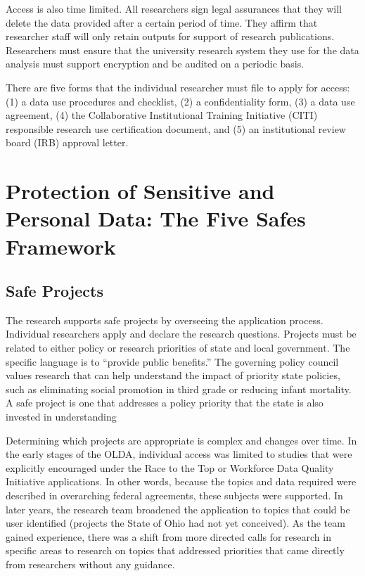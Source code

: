 Access is also time limited. All researchers sign legal assurances that they will delete the data provided after a certain period of time. They affirm that researcher staff will only retain outputs for support of research publications. Researchers must ensure that the university research system they use for the data analysis must support encryption and be audited on a periodic basis.

There are five forms that the individual researcher must file to apply for access: (1) a data use procedures and checklist, (2) a confidentiality form, (3) a data use agreement, (4) the Collaborative Institutional Training Initiative (CITI) responsible research use certification document, and (5) an institutional review board (IRB) approval letter.

\hypertarget{protection-of-sensitive-and-personal-data-the-five-safes-framework-1}{%
\section{Protection of Sensitive and Personal Data: The Five Safes Framework}\label{protection-of-sensitive-and-personal-data-the-five-safes-framework-1}}

\hypertarget{safe-projects-1}{%
\subsection{Safe Projects}\label{safe-projects-1}}

The research supports safe projects by overseeing the application process. Individual researchers apply and declare the research questions. Projects must be related to either policy or research priorities of state and local government. The specific language is to ``provide public benefits.'' The governing policy council values research that can help understand the impact of priority state policies, such as eliminating social promotion in third grade or reducing infant mortality. A safe project is one that addresses a policy priority that the state is also invested in understanding

Determining which projects are appropriate is complex and changes over time. In the early stages of the OLDA, individual access was limited to studies that were explicitly encouraged under the Race to the Top or Workforce Data Quality Initiative applications. In other words, because the topics and data required were described in overarching federal agreements, these subjects were supported. In later years, the research team broadened the application to topics that could be user identified (projects the State of Ohio had not yet conceived). As the team gained experience, there was a shift from more directed calls for research in specific areas to research on topics that addressed priorities that came directly from researchers without any guidance.

